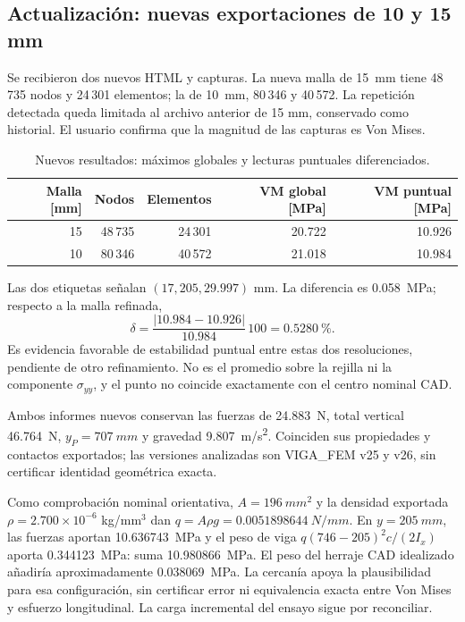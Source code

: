 \documentclass[11pt,a4paper]{article}
\begin{document}
\subsection{Actualización: nuevas exportaciones de 10 y 15 mm}
Se recibieron dos nuevos HTML y capturas. La nueva malla de \SI{15}{mm} tiene 48\,735 nodos y 24\,301 elementos; la de \SI{10}{mm}, 80\,346 y 40\,572. La repetición detectada queda limitada al archivo anterior de 15 mm, conservado como historial. El usuario confirma que la magnitud de las capturas es Von Mises.
\begin{table}[H]\centering\small
\caption{Nuevos resultados: máximos globales y lecturas puntuales diferenciados.}
\begin{tabular}{@{}rrrrr@{}}\toprule
Malla [mm] & Nodos & Elementos & VM global [MPa] & VM puntual [MPa] \\\midrule
15 & 48\,735 & 24\,301 & 20.722 & 10.926 \\
10 & 80\,346 & 40\,572 & 21.018 & 10.984 \\
\bottomrule\end{tabular}\end{table}
Las dos etiquetas señalan $(17,205,29.997)$ mm. La diferencia es \SI{0.058}{MPa}; respecto a la malla refinada,
\begin{equation}\delta=\frac{|10.984-10.926|}{10.984}\,100=\SI{0.5280}{\percent}.\end{equation}
Es evidencia favorable de estabilidad puntual entre estas dos resoluciones, pendiente de otro refinamiento. No es el promedio sobre la rejilla ni la componente $\sigma_{yy}$, y el punto no coincide exactamente con el centro nominal CAD.

Ambos informes nuevos conservan las fuerzas de \SI{24.883}{N}, total vertical \SI{46.764}{N}, $y_P=\SI{707}{mm}$ y gravedad \SI{9.807}{m/s^2}. Coinciden sus propiedades y contactos exportados; las versiones analizadas son VIGA\_FEM v25 y v26, sin certificar identidad geométrica exacta.

Como comprobación nominal orientativa, $A=\SI{196}{mm^2}$ y la densidad exportada $\rho=2.700\times10^{-6}$ kg/mm$^3$ dan $q=A\rho g=\SI{0.0051898644}{N/mm}$. En $y=\SI{205}{mm}$, las fuerzas aportan \SI{10.636743}{MPa} y el peso de viga $q(746-205)^2c/(2I_x)$ aporta \SI{0.344123}{MPa}: suma \SI{10.980866}{MPa}. El peso del herraje CAD idealizado añadiría aproximadamente \SI{0.038069}{MPa}. La cercanía apoya la plausibilidad para esa configuración, sin certificar error ni equivalencia exacta entre Von Mises y esfuerzo longitudinal. La carga incremental del ensayo sigue por reconciliar.
\end{document}
